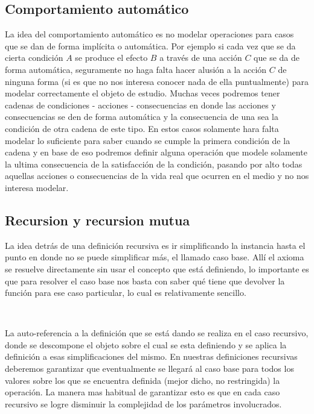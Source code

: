 \subsection{Comportamiento autom\'atico}

La idea del comportamiento autom\'atico es no modelar operaciones para casos que se dan de forma impl\'icita o autom\'atica. Por ejemplo si cada vez que se da cierta condici\'on $A$ se produce el efecto $B$ a trav\'es de una acci\'on $C$ que se da de forma autom\'atica, seguramente no haga falta hacer alusi\'on a la acci\'on $C$ de ninguna forma (si es que no nos interesa conocer nada de ella puntualmente) para modelar correctamente el objeto de estudio. Muchas veces podremos tener cadenas de condiciones - acciones - consecuencias en donde las acciones y consecuencias se den de forma autom\'atica y la consecuencia de una sea la condici\'on de otra cadena de este tipo. En estos casos solamente hara falta modelar lo suficiente para saber cuando se cumple la primera condici\'on de la cadena y en base de eso podremos definir alguna operaci\'on que modele solamente la ultima consecuencia de la satisfacci\'on de la condici\'on, pasando por alto todas aquellas acciones o consecuencias de la vida real que ocurren en 
el medio y no nos interesa modelar.

\subsection{Recursion y recursion mutua}

La idea detr\'as de una definici\'on recursiva es ir simplificando la instancia hasta el punto en donde no se puede simplificar m\'as, el llamado caso base. All\'i el axioma se resuelve directamente sin usar el concepto que est\'a definiendo, lo importante es que para resolver el caso base nos basta con saber qu\'e tiene que devolver la funci\'on para ese caso particular, lo cual es relativamente sencillo.

~

La auto-referencia a la definici\'on que se est\'a dando se realiza en el caso recursivo, donde se descompone el objeto sobre el cual se esta definiendo y se aplica la definici\'on a esas simplificaciones del mismo. En nuestras definiciones recursivas deberemos garantizar que eventualmente se llegar\'a al caso base para todos los valores sobre los que se encuentra definida (mejor dicho, no restringida) la operaci\'on. La manera mas habitual de garantizar esto es que en cada caso recursivo se logre disminuir la complejidad de los par\'ametros involucrados.

